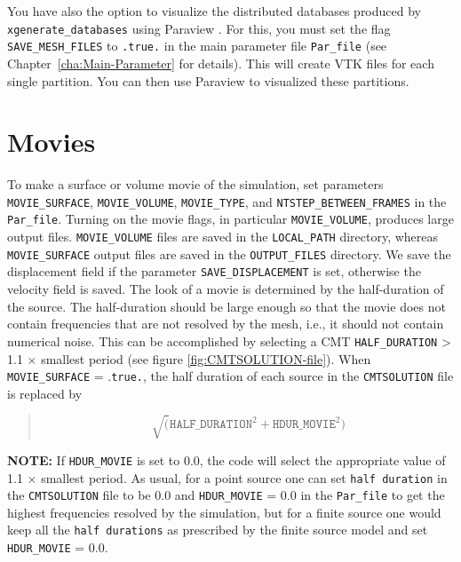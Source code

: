 You have also the option to visualize the distributed databases produced
by \texttt{xgenerate\_databases} using Paraview .
For this, you must set the flag \texttt{SAVE\_MESH\_FILES} to \texttt{.true.}
in the main parameter file \texttt{Par\_file} (see Chapter~\ref{cha:Main-Parameter}
for details). This will create VTK files for each single partition.
You can then use Paraview 
to visualized these partitions.


\section{Movies}\label{sec:Movies}

To make a surface or volume movie of the simulation, set parameters
\texttt{MOVIE\_SURFACE}, \texttt{MOVIE\_VOLUME}, \texttt{MOVIE\_TYPE},
and \texttt{NTSTEP\_BETWEEN\_FRAMES} in the \texttt{Par\_file}. Turning
on the movie flags, in particular \texttt{MOVIE\_VOLUME}, produces
large output files. \texttt{MOVIE\_VOLUME} files are saved in the
\texttt{LOCAL\_PATH} directory, whereas \texttt{MOVIE\_SURFACE} output
files are saved in the \texttt{OUTPUT\_FILES} directory. We save the
displacement field if the parameter \texttt{SAVE\_DISPLACEMENT} is
set, otherwise the velocity field is saved. The look of a movie is
determined by the half-duration of the source. The half-duration should
be large enough so that the movie does not contain frequencies that
are not resolved by the mesh, i.e., it should not contain numerical
noise. This can be accomplished by selecting a CMT \texttt{HALF\_DURATION}
> 1.1 $\times$ smallest period (see figure \ref{fig:CMTSOLUTION-file}).
When \texttt{MOVIE\_SURFACE} = .\texttt{true.}, the half duration
of each source in the \texttt{CMTSOLUTION} file is replaced by
\begin{quote}
\[
\sqrt{(}\mathrm{\mathtt{HALF\_DURATIO}\mathtt{N}^{2}}+\mathrm{\mathtt{HDUR\_MOVI}\mathtt{E}^{2}})
\]
\end{quote}

\textbf{NOTE:} If \texttt{HDUR\_MOVIE} is set to 0.0, the code will
select the appropriate value of 1.1 $\times$ smallest period. As
usual, for a point source one can set \texttt{half duration} in the
\texttt{CMTSOLUTION} file to be 0.0 and \texttt{HDUR\_MOVIE} = 0.0
in the \texttt{Par\_file} to get the highest frequencies resolved
by the simulation, but for a finite source one would keep all the
\texttt{half durations} as prescribed by the finite source model and
set \texttt{HDUR\_MOVIE} = 0.0.

